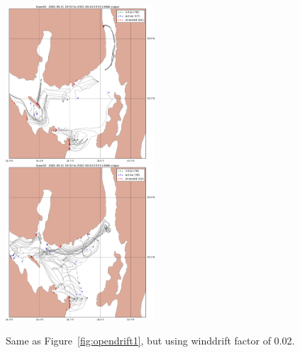 \documentclass[12pt,a4paper,english]{article}
\begin{document}
\begin{figure}[ht]
\centerline{
\includegraphics*[width=0.495\textwidth]{Opendrift_simulations/LTR3/tokt_drifters_winddrift_0p2_radius_0_num_6_plusminus_2p5h_crop}
\includegraphics*[width=0.495\textwidth]{Opendrift_simulations/LTR3/tokt_drifters_winddrift_0p2_radius_0_num_6_plusminus_2p5h_norkyst_crop}
}
\caption{\small
Same as Figure~\ref{fig:opendrift1}, but using winddrift factor of 0.02.
}
\label{fig:opendrift3}
\end{figure}
\end{document}
